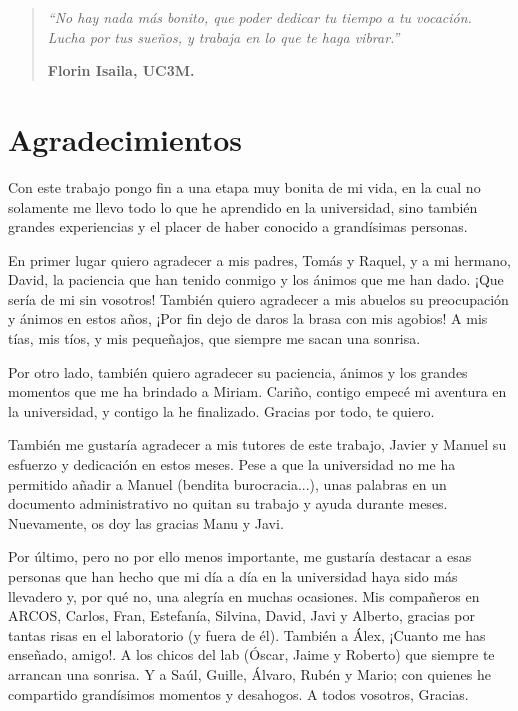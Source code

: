\thispagestyle{empty}
\vspace*{\fill} 
\begin{quote}
\epigraph{\large \textit{``No hay nada más bonito, que poder dedicar tu tiempo a tu vocación. Lucha por tus sueños, y trabaja en lo que te haga vibrar.''}}{\large \flushright \textbf{Florin Isaila, UC3M.}}
\end{quote}
\vspace*{\fill} 

\chapter*{Agradecimientos}
%

Con este trabajo pongo fin a una etapa muy bonita de mi vida, en la cual no solamente me llevo todo lo que he aprendido en la universidad, sino también grandes experiencias y el placer de haber conocido a grandísimas personas.

En primer lugar quiero agradecer a mis padres, Tomás y Raquel, y a mi hermano, David, la paciencia que han tenido conmigo y los ánimos que me han dado. ¡Que sería de mi sin vosotros! También quiero agradecer a mis abuelos su preocupación y ánimos en estos años, ¡Por fin dejo de daros la brasa con mis agobios! A mis tías, mis tíos, y mis pequeñajos, que siempre me sacan una sonrisa.

Por otro lado, también quiero agradecer su paciencia, ánimos y los grandes momentos que me ha brindado a Miriam. Cariño, contigo empecé mi aventura en la universidad, y contigo la he finalizado. Gracias por todo, te quiero.

También me gustaría agradecer a mis tutores de este trabajo, Javier y Manuel su esfuerzo y dedicación en estos meses. Pese a que la universidad no me ha permitido añadir a Manuel (bendita burocracia...), unas palabras en un documento administrativo no quitan su trabajo y ayuda durante meses. Nuevamente, os doy las gracias Manu y Javi.

Por último, pero no por ello menos importante, me gustaría destacar a esas personas que han hecho que mi día a día en la universidad haya sido más llevadero y, por qué no, una alegría en muchas ocasiones. Mis compañeros en ARCOS, Carlos, Fran, Estefanía, Silvina, David, Javi y Alberto, gracias por tantas risas en el laboratorio (y fuera de él). También a Álex, ¡Cuanto me has enseñado, amigo!. A los chicos del lab (Óscar, Jaime y Roberto) que siempre te arrancan una sonrisa. Y a Saúl, Guille, Álvaro, Rubén y Mario; con quienes he compartido grandísimos momentos y desahogos. A todos vosotros, Gracias.

